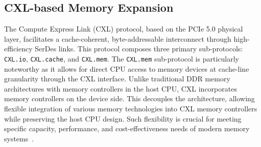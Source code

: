 % 



\subsection{CXL-based Memory Expansion}
The Compute Express Link (CXL) protocol\cite{cxl}, based on the PCIe 5.0 physical layer, facilitates a cache-coherent, byte-addressable interconnect through high-efficiency SerDes links. This protocol composes three primary sub-protocols: \texttt{CXL.io}, \texttt{CXL.cache}, and \texttt{CXL.mem}. 
The \texttt{CXL.mem} sub-protocol is particularly noteworthy as it allows for direct CPU access to memory devices at cache-line granularity through the CXL interface. 
Unlike traditional DDR memory architectures with memory controllers in the host CPU, CXL incorporates memory controllers on the device side.
This decouples the architecture, allowing flexible integration of various memory technologies into CXL memory controllers while preserving the host CPU design. Such flexibility is crucial for meeting specific capacity, performance, and cost-effectiveness needs of modern memory systems~\cite{hynix_cxl_mem, samsung_cxl_mem, pond_asplos2023, cxl_enhanced_memory_function}.


